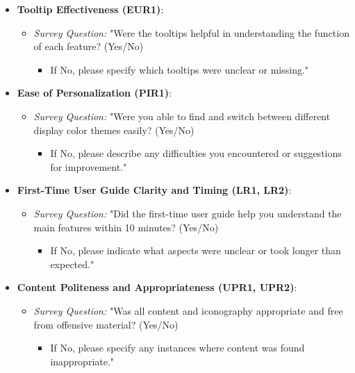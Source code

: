 \documentclass[12pt, titlepage]{article}
\begin{document}
\begin{itemize}
    \item \textbf{Tooltip Effectiveness (EUR1)}:
    \begin{itemize}
        \item \textit{Survey Question:} "Were the tooltips helpful in understanding the function of each feature? (Yes/No)  
        \begin{itemize}
            \item If No, please specify which tooltips were unclear or missing."
        \end{itemize}
    \end{itemize}

    \item \textbf{Ease of Personalization (PIR1)}:
    \begin{itemize}
        \item \textit{Survey Question:} "Were you able to find and switch between different display color themes easily? (Yes/No)  
        \begin{itemize}
            \item If No, please describe any difficulties you encountered or suggestions for improvement."
        \end{itemize}
    \end{itemize}

    \item \textbf{First-Time User Guide Clarity and Timing (LR1, LR2)}:
    \begin{itemize}
        \item \textit{Survey Question:} "Did the first-time user guide help you understand the main features within 10 minutes? (Yes/No)  
        \begin{itemize}
            \item If No, please indicate what aspects were unclear or took longer than expected."
        \end{itemize}
    \end{itemize}

    \item \textbf{Content Politeness and Appropriateness (UPR1, UPR2)}:
    \begin{itemize}
        \item \textit{Survey Question:} "Was all content and iconography appropriate and free from offensive material? (Yes/No)  
        \begin{itemize}
            \item If No, please specify any instances where content was found inappropriate."
        \end{itemize}
    \end{itemize}


\end{itemize}
\end{document}

